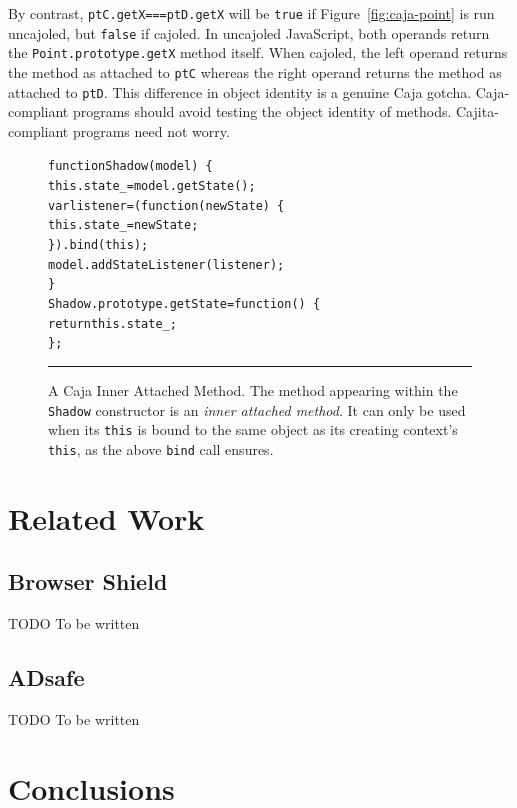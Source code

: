 \documentclass[letterpaper,twocolumn,10pt]{article}
\newcommand{\code}[1]{{\tt {#1}}}              %
\begin{document}
\begin{description}
  By contrast, \code{ptC.getX===ptD.getX} will be \code{true} if 
  Figure~\ref{fig:caja-point} is run uncajoled, but \code{false} if cajoled. 
  In uncajoled JavaScript, both operands return the 
  \code{Point.prototype.getX} method itself. When cajoled, the left operand 
  returns the method as attached to \code{ptC} whereas the right operand 
  returns the method as attached to \code{ptD}. This difference in 
  object identity is a genuine Caja gotcha. Caja-compliant programs should 
  avoid testing the object identity of methods. Cajita-compliant programs 
  need not worry.

\end{description}


\begin{figure}[t!]
\begin{alltt}
function Shadow(model)\ \{
  this.state_ = model.getState();
  var listener = (function(newState)\ \{
    this.state_ = newState;
  \}).bind(this);
  model.addStateListener(listener);
\}
Shadow.prototype.getState = function()\ \{
  return this.state_;
\};
\end{alltt}

\caption[A Caja Inner Attached Method.]{A Caja Inner Attached Method. The method 
appearing within the \code{Shadow} constructor is an \emph{inner attached method}. 
It can only be used when its \code{this} is bound to the same object as its 
creating context's \code{this}, as the above \code{bind} call ensures.\\ } 
\hrule
\label{fig:caja-attached-method}
\end{figure}


\section{Related Work}
\label{sec:related}

\subsection{Browser Shield}

TODO To be written

\subsection{ADsafe}

TODO To be written

\section{Conclusions}
\end{document}
